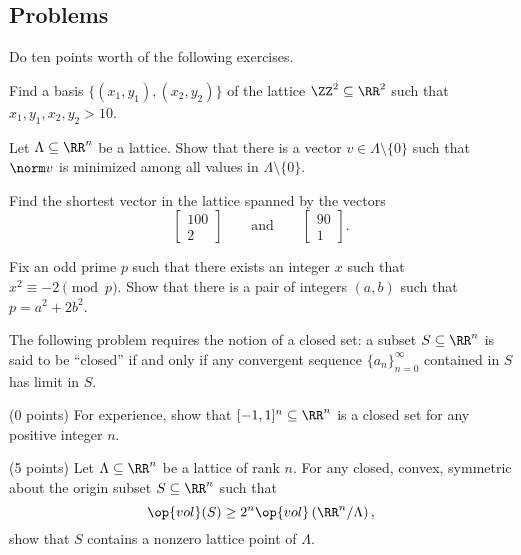 \documentclass[../notes.tex]{subfiles}
\begin{document}
\subsection{Problems}
Do ten points worth of the following exercises.
\begin{prob}[1 point]
	Find a basis $\{(x_1,y_1),(x_2,y_2)\}$ of the lattice $\ZZ^2\subseteq\RR^2$ such that $x_1,y_1,x_2,y_2>10$.
\end{prob}
\begin{prob}[2 points]
	Let $\Lambda\subseteq\RR^n$ be a lattice. Show that there is a vector $v\in\Lambda\setminus\{0\}$ such that $\norm v$ is minimized among all values in $\Lambda\setminus\{0\}$.
\end{prob}
\begin{prob}[3 points]
	Find the shortest vector in the lattice spanned by the vectors
	\[\begin{bmatrix}
		100 \\
		2
	\end{bmatrix}\qquad\text{and}\qquad\begin{bmatrix}
		90 \\
		1
	\end{bmatrix}.\]
\end{prob}
\begin{prob}[4 points]
	Fix an odd prime $p$ such that there exists an integer $x$ such that $x^2\equiv-2\pmod p$. Show that there is a pair of integers $(a,b)$ such that $p=a^2+2b^2$.
\end{prob}
\begin{prob}[6 points]
	The following problem requires the notion of a closed set: a subset $S\subseteq\RR^n$ is said to be ``closed'' if and only if any convergent sequence $\{a_n\}_{n=0}^\infty$ contained in $S$ has limit in $S$.
	\begin{listalph}
		\item (0 points) For experience, show that $[-1,1]^n\subseteq\RR^n$ is a closed set for any positive integer $n$.
		\item (5 points) Let $\Lambda\subseteq\RR^n$ be a lattice of rank $n$. For any closed, convex, symmetric about the origin subset $S\subseteq\RR^n$ such that
		\[\op{vol}(S)\ge2^n\op{vol}\left(\RR^n/\Lambda\right),\]
		show that $S$ contains a nonzero lattice point of $\Lambda$.
	\end{listalph}
\end{prob}
\end{document}
